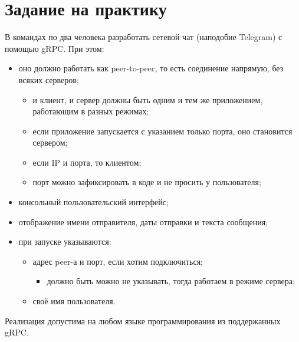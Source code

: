 \documentclass{../../text-style}
\begin{document}
\maketitle
\thispagestyle{empty}

\section{Задание на практику}

В командах по два человека разработать сетевой чат (наподобие Telegram) с помощью gRPC. При этом:

\begin{itemize}
    \item оно должно работать как peer-to-peer, то есть соединение напрямую, без всяких серверов;
    \begin{itemize}
        \item и клиент, и сервер должны быть одним и тем же приложением, работающим в разных режимах;
        \item если приложение запускается с указанием только порта, оно становится сервером;
        \item если IP и порта, то клиентом;
        \item порт можно зафиксировать в коде и не просить у пользователя;
    \end{itemize}
    \item консольный пользовательский интерфейс;
    \item отображение имени отправителя, даты отправки и текста сообщения;
    \item при запуске указываются:
    \begin{itemize}
        \item адрес peer-а и порт, если хотим подключиться;
        \begin{itemize}
            \item должно быть можно не указывать, тогда работаем в режиме сервера;
        \end{itemize}
        \item своё имя пользователя.
    \end{itemize}
\end{itemize}

Реализация допустима на любом языке программирования из поддержанных gRPC.
\end{document}
